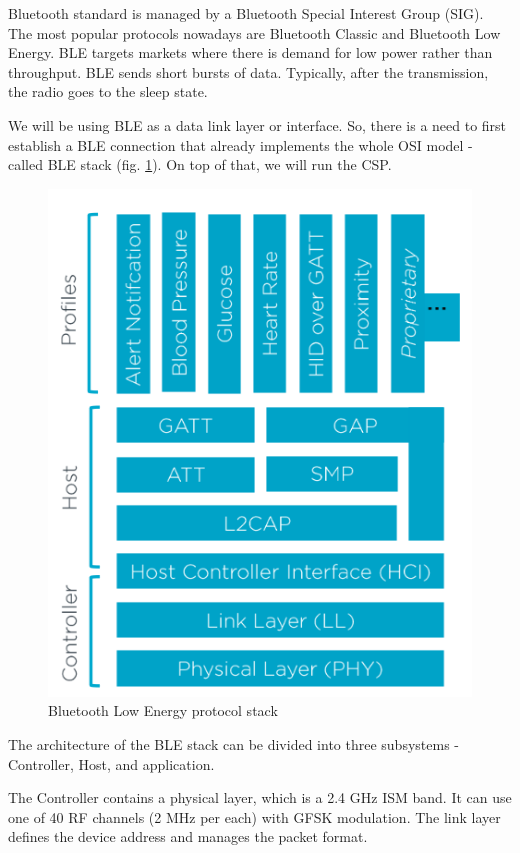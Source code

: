 \documentclass[conference]{IEEEtran}
\begin{document}
Bluetooth standard is managed by a Bluetooth Special Interest Group (SIG). The most popular protocols nowadays are Bluetooth Classic and Bluetooth Low Energy. BLE targets markets where there is demand for low power rather than throughput. BLE sends short bursts of data. Typically, after the transmission, the radio goes to the sleep state.\cite{NovelBits}

We will be using BLE as a data link layer or interface. So, there is a need to first establish a BLE connection that already implements the whole OSI model - called BLE stack (fig. \ref{ble}). On top of that, we will run the CSP.

\begin{figure}[htbp]
    \centerline{\includegraphics[width=\linewidth]{images/ble-stack}}
    \caption{Bluetooth Low Energy protocol stack \cite{ble-nordic-intro}}
    \label{ble}
\end{figure}

The architecture of the BLE stack can be divided into three subsystems - Controller, Host, and application.\cite{ble-nordic-intro}

The Controller contains a physical layer, which is a 2.4 GHz ISM band. It can use one of 40 RF channels (2 MHz per each) with GFSK modulation. The link layer defines the device address and manages the packet format.
\end{document}
